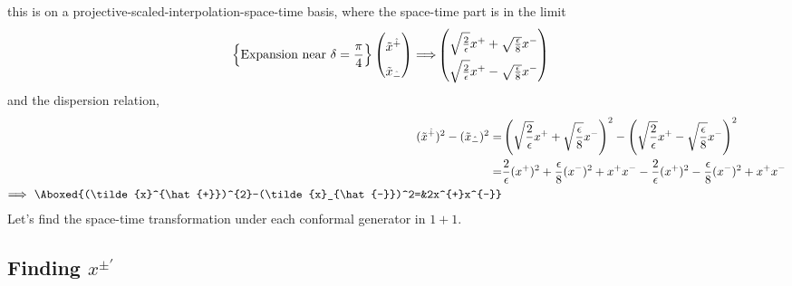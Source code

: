 \documentclass[]{article}
\numberwithin{equation}{section}
\begin{document}
{{\begin{align}
\end{align}
this is on a projective-scaled-interpolation-space-time basis, where the space-time part is in the limit
\begin{align}
\left\{\text{Expansion near $\delta=\frac{\pi}{4}$}\right\}
    \begin{pmatrix}
   \rule{0pt}{16pt} \tilde{x}^{\hat{+}}\\
    \rule{0pt}{16pt} \tilde{x}_{\hat{-}}
  \end{pmatrix}\Longrightarrow&
  \begin{pmatrix}
    \rule{0pt}{16pt} \sqrt{\frac{2}{\epsilon}}x^{+} +\sqrt{\frac{\epsilon}{8}}x^{-} \\
    \rule{0pt}{16pt} \sqrt{\frac{2}{\epsilon}}x^{+}  -\sqrt{\frac{\epsilon}{8}}x^{-}
  \end{pmatrix}
\end{align}
and the dispersion relation,
\begin{align}
    (\tilde{x}^{\hat{+}})^{2}-(\tilde{x}_{\hat{-}})^2=&\left(\sqrt{\frac{2}{\epsilon}}x^{+} +\sqrt{\frac{\epsilon}{8}}x^{-}\right)^2-\left(\sqrt{\frac{2}{\epsilon}}x^{+}  -\sqrt{\frac{\epsilon}{8}}x^{-}\right)^2\\
    =&\frac{2}{\epsilon}(x^{+})^{2}+\frac{\epsilon}{8}(x^{-})^{2}+x^{+}x^{-}-\frac{2}{\epsilon}(x^{+})^{2}-\frac{\epsilon}{8}(x^{-})^{2}+x^{+}x^{-}\\
    \Longrightarrow~\Aboxed{(\tilde{x}^{\hat{+}})^{2}-(\tilde{x}_{\hat{-}})^2=&2x^{+}x^{-}}
\end{align}
Let's find the space-time transformation under each conformal generator in $1+1$.
\subsection{Finding $x^{\pm\prime}$}
}}
\end{document}
